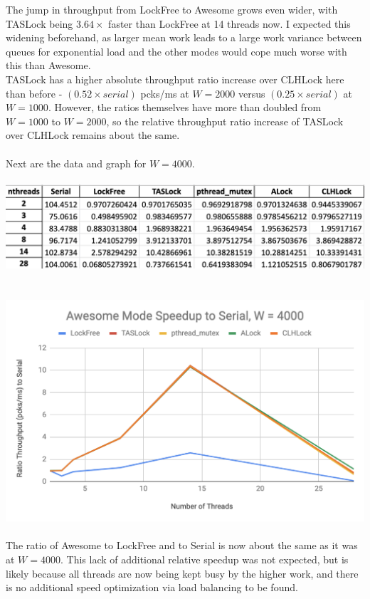 \documentclass{article}
\begin{document}
\begin{adjustwidth}{-2cm}{-2cm}
The jump in throughput from LockFree to Awesome grows even wider, with TASLock being $3.64\times$ faster than LockFree at 14 threads now. I expected this widening beforehand, as larger mean work leads to a large work variance between queues for exponential load and the other modes would cope much worse with this than Awesome.\\
TASLock has a higher absolute throughput ratio increase over CLHLock here than before - $(0.52 \times serial)$ pcks/ms at $W=2000$ versus $(0.25 \times serial)$ at $W=1000$. However, the ratios themselves have more than doubled from $W=1000$ to $W=2000$, so the relative throughput ratio increase of TASLock over CLHLock remains about the same.\\
\null\\Next are the data and graph for $W=4000$.\\
\null\\
\includegraphics[width=\linewidth]{b_awe4000Data.png}\\ \null\\
\null\\
\includegraphics[width=\linewidth]{b_awe4000Graph.png}\\ \null\\
The ratio of Awesome to LockFree and to Serial is now about the same as it was at $W=4000$. This lack of additional relative speedup was not expected, but is likely because all threads are now being kept busy by the higher work, and there is no additional speed optimization via load balancing to be found.\\

\end{adjustwidth}
\end{document}
